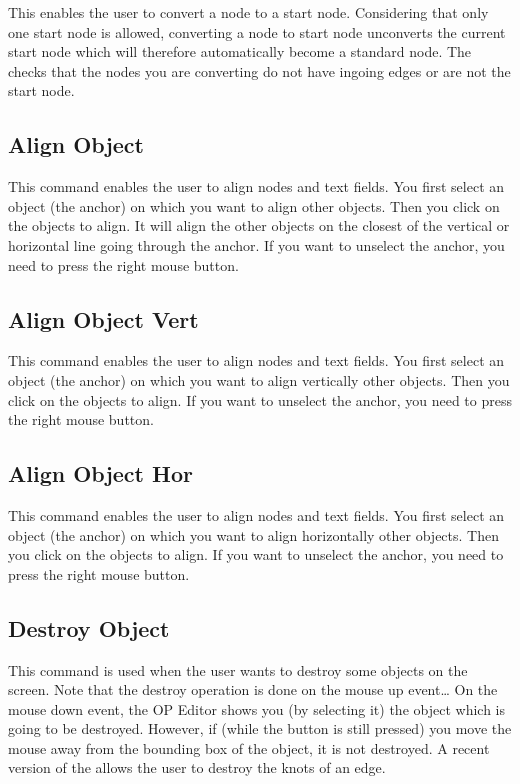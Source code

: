 This enables the user to convert a node to a start node. Considering that
only one start node is allowed, converting a node to start node
unconverts the current start node which will therefore automatically become
a standard node. The \OPE{} checks that the nodes you are converting do not
have ingoing edges or are not the start node.

\subsection{Align Object}

This command enables the user to align nodes and text fields. You first
select an object (the anchor) on which you want to align other objects.
Then you click on the objects to align. It will align the other objects on the
closest of the vertical or horizontal line going through the anchor. If you
want to unselect the anchor, you need to press the right mouse button.

\subsection{Align Object Vert}

This command enables the user to align nodes and text fields. You first select
an object (the anchor) on which you want to align vertically other objects.
Then you click on the objects to align. If you want to unselect the anchor, you
need to press the right mouse button.

\subsection{Align Object Hor}

This command enables the user to align nodes and text fields. You first select
an object (the anchor) on which you want to align horizontally other objects.
Then you click on the objects to align. If you want to unselect the anchor, you
need to press the right mouse button.

\subsection{Destroy Object}

This command is used when the user wants to destroy some objects on the screen.
Note that the destroy operation is done on the mouse up event\dots{} On the
mouse down event, the OP Editor shows you (by selecting it) the object which is
going to be destroyed. However, if (while the button is still pressed) you move
the mouse away from the bounding box of the object, it is not destroyed. A
recent version of the \OPE{} allows the user to destroy the knots of an edge.

